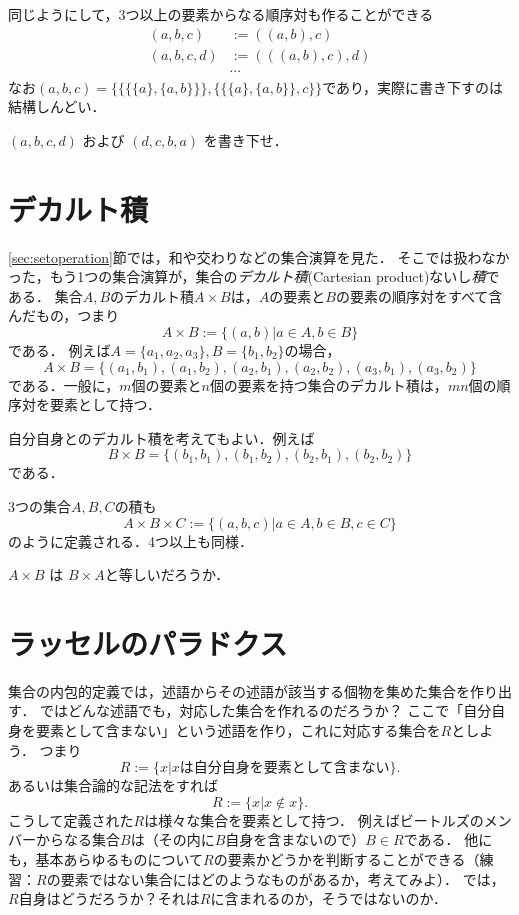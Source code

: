 \documentclass[11pt,a4paper]{jsarticle}
\begin{document}
同じようにして，3つ以上の要素からなる順序対も作ることができる
\begin{align*}
 (a, b, c) &:= ((a,b), c) \\
 (a, b, c, d) &:= (((a,b), c), d) \\
&\cdots
\end{align*}
なお$ (a, b, c) = \{\{\{\{a\}, \{a,b\}\}\}, \{\{\{a\}, \{a,b\}\}, c\}\}$であり，実際に書き下すのは結構しんどい．

\begin{exercise}
$(a,b,c,d)$ および $(d,c,b,a)$ を書き下せ．
\end{exercise} 

 
\section{デカルト積}
\ref{sec:setoperation}節では，和や交わりなどの集合演算を見た．
そこでは扱わなかった，もう1つの集合演算が，集合の\emph{デカルト積}(Cartesian product)ないし\emph{積}である．
集合$A, B$のデカルト積$A \times B$は，$A$の要素と$B$の要素の順序対をすべて含んだもの，つまり
\[
 A \times B := \{ (a, b) | a \in A, b \in B\}
\]
である．
例えば$A = \{a_1, a_2, a_3\}, B = \{b_1, b_2\}$の場合，
\[
A \times B = \{(a_1, b_1), (a_1, b_2), (a_2, b_1), (a_2, b_2), (a_3, b_1), (a_3, b_2)\}
\]
である．一般に，$m$個の要素と$n$個の要素を持つ集合のデカルト積は，$mn$個の順序対を要素として持つ．

自分自身とのデカルト積を考えてもよい．例えば
\[
B \times B = \{(b_1, b_1), (b_1, b_2), (b_2, b_1), (b_2, b_2)\}
\]
である．

3つの集合$A, B, C$の積も
\[
 A \times B \times C := \{ (a, b, c) | a \in A, b \in B, c \in C \}
\]
のように定義される．4つ以上も同様．


\begin{exercise}
$A \times B$ は $B \times A$と等しいだろうか．
\end{exercise} 

%


\section{ラッセルのパラドクス}
集合の内包的定義では，述語からその述語が該当する個物を集めた集合を作り出す．
ではどんな述語でも，対応した集合を作れるのだろうか？
ここで「自分自身を要素として含まない」という述語を作り，これに対応する集合を$R$としよう．
つまり
\[
 R := \{x | x \text{は自分自身を要素として含まない}\}.
\]
あるいは集合論的な記法をすれば
\[
 R := \{x | x \not \in x\}.
\]
こうして定義された$R$は様々な集合を要素として持つ．
例えばビートルズのメンバーからなる集合$B$は（その内に$B$自身を含まないので）$B \in R$である．
他にも，基本あらゆるものについて$R$の要素かどうかを判断することができる（練習：$R$の要素ではない集合にはどのようなものがあるか，考えてみよ）．
では，$R$自身はどうだろうか？それは$R$に含まれるのか，そうではないのか．
\end{document}
